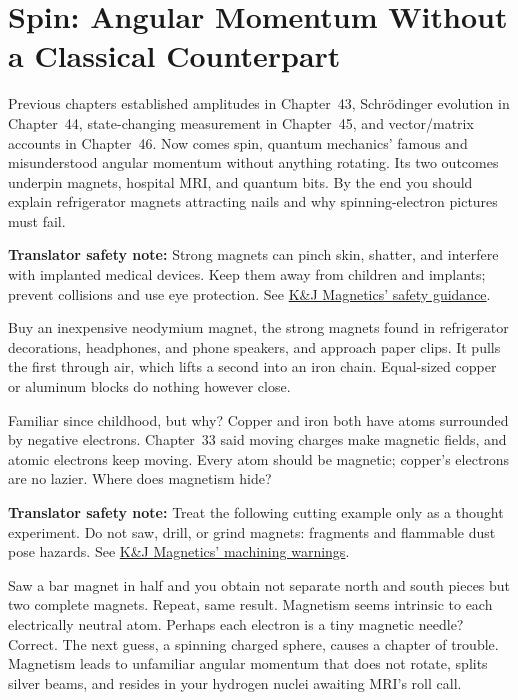 \chapter[Spin: Nonclassical Angular Momentum]{Spin: Angular Momentum Without a Classical Counterpart}

Previous chapters established amplitudes in Chapter~43, Schrödinger evolution in Chapter~44, state-changing measurement in Chapter~45, and vector/matrix accounts in Chapter~46. Now comes spin, quantum mechanics' famous and misunderstood angular momentum without anything rotating. Its two outcomes underpin magnets, hospital MRI, and quantum bits. By the end you should explain refrigerator magnets attracting nails and why spinning-electron pictures must fail.


\textbf{Translator safety note:} Strong magnets can pinch skin, shatter, and interfere with implanted medical devices. Keep them away from children and implants; prevent collisions and use eye protection. See \href{https://www.kjmagnetics.com/neodymium-magnet-safety.asp}{K\&J Magnetics' safety guidance}.

Buy an inexpensive neodymium magnet, the strong magnets found in refrigerator decorations, headphones, and phone speakers, and approach paper clips. It pulls the first through air, which lifts a second into an iron chain. Equal-sized copper or aluminum blocks do nothing however close.

Familiar since childhood, but why? Copper and iron both have atoms surrounded by negative electrons. Chapter~33 said moving charges make magnetic fields, and atomic electrons keep moving. Every atom should be magnetic; copper's electrons are no lazier. Where does magnetism hide?

\textbf{Translator safety note:} Treat the following cutting example only as a thought experiment. Do not saw, drill, or grind magnets: fragments and flammable dust pose hazards. See \href{https://www.kjmagnetics.com/faq.asp}{K\&J Magnetics' machining warnings}.

Saw a bar magnet in half and you obtain not separate north and south pieces but two complete magnets. Repeat, same result. Magnetism seems intrinsic to each electrically neutral atom. Perhaps each electron is a tiny magnetic needle? Correct. The next guess, a spinning charged sphere, causes a chapter of trouble. Magnetism leads to unfamiliar angular momentum that does not rotate, splits silver beams, and resides in your hydrogen nuclei awaiting MRI's roll call.


